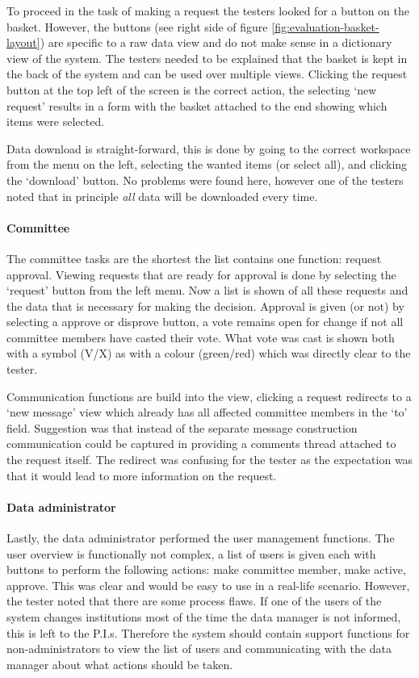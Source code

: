 To proceed in the task of making a request the testers looked for a button on the basket.
However, the buttons (see right side of figure \ref{fig:evaluation-basket-layout}) are specific to a raw data view and do not make sense in a dictionary view of the system.
The testers needed to be explained that the basket is kept in the back of the system and can be used over multiple views.
Clicking the request button at the top left of the screen is the correct action, the selecting `new request' results in a form with the basket attached to the end showing which items were selected.

Data download is straight-forward, this is done by going to the correct workspace from the menu on the left, selecting the wanted items (or select all), and clicking the `download' button.
No problems were found here, however one of the testers noted that in principle \emph{all} data will be downloaded every time.

\paragraph{Committee}
The committee tasks are the shortest the list contains one function: request approval.
Viewing requests that are ready for approval is done by selecting the `request' button from the left menu.
Now a list is shown of all these requests and the data that is necessary for making the decision.
Approval is given (or not) by selecting a approve or disprove button, a vote remains open for change if not all committee members have casted their vote.
What vote was cast is shown both with a symbol (V/X) as with a colour (green/red) which was directly clear to the tester.

Communication functions are build into the view, clicking a request redirects to a `new message' view which already has all affected committee members in the `to' field.
Suggestion was that instead of the separate message construction communication could be captured in providing a comments thread attached to the request itself.
The redirect was confusing for the tester as the expectation was that it would lead to more information on the request.

\paragraph{Data administrator}
Lastly, the data administrator performed the user management functions.
The user overview is functionally not complex, a list of users is given each with buttons to perform the following actions: make committee member, make active, approve.
This was clear and would be easy to use in a real-life scenario.
However, the tester noted that there are some process flaws.
If one of the users of the system changes institutions most of the time the data manager is not informed, this is left to the P.I.s.
Therefore the system should contain support functions for non-administrators to view the list of users and communicating with the data manager about what actions should be taken.